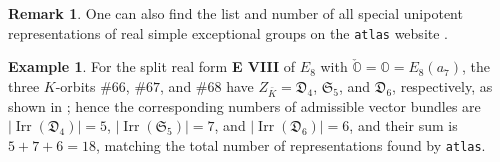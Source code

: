 \documentclass[11pt, a4paper]{amsart}
\newcommand{\orb}{\mathbb{O}}
\newcommand{\fD}{\mathfrak{D}}
\newcommand{\fS}{\mathfrak{S}}
\newcommand{\ckorb}{\check{\orb}}
\newcommand{\Irr}{\operatorname{Irr}}
\theoremstyle{definition}
\newtheorem{Ex}[Thm]{Example}
\newtheorem{Rem}[Thm]{Remark}
\numberwithin{equation}{section}
\begin{document}
\begin{Rem} \label{rem:atlas_exceptional}
	One can also find the list and number of all special unipotent representations of real simple exceptional groups on the \texttt{atlas} website \cite{atlas_exceptional}.
\end{Rem}

\begin{Ex}
	For the split real form {\bf E VIII} of $E_8$ with $\ckorb=\orb=E_8(a_7)$, the three $K$-orbits $\#66$, $\#67$, and $\#68$ have $Z_{\bar{K}}=\fD_4$, $\fS_5$, and $\fD_6$, respectively, as shown in ; hence the corresponding numbers of admissible vector bundles are $|\Irr(\fD_4)|=5$, $|\Irr(\fS_5)|=7$, and $|\Irr(\fD_6)|=6$, and their sum is $5+7+6=18$, matching the total number of representations found by \texttt{atlas}. 
\end{Ex}
\end{document}
